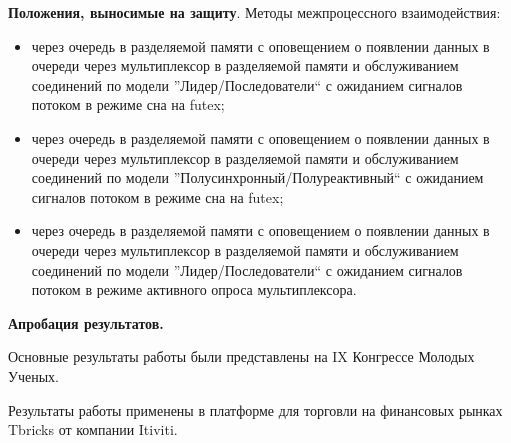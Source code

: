 \textbf{Положения, выносимые на защиту}. Методы межпроцессного взаимодействия:
\begin{itemize}
\item через очередь в разделяемой памяти с оповещением о появлении данных в очереди через мультиплексор в разделяемой памяти и обслуживанием соединений по модели ''Лидер/Последователи`` с ожиданием сигналов потоком в режиме сна на futex;
\item через очередь в разделяемой памяти с оповещением о появлении данных в очереди через мультиплексор в разделяемой памяти и обслуживанием соединений по модели ''Полусинхронный/Полуреактивный`` с ожиданием сигналов потоком в режиме сна на futex;
\item через очередь в разделяемой памяти с оповещением о появлении данных в очереди через мультиплексор в разделяемой памяти и обслуживанием соединений по модели ''Лидер/Последователи`` с ожиданием сигналов потоком в режиме активного опроса мультиплексора.
\end{itemize}


\textbf{Апробация результатов.}

Основные результаты работы были представлены на IX Конгрессе Молодых Ученых.

Результаты работы применены в платформе для торговли на финансовых рынках Tbricks от компании Itiviti.

